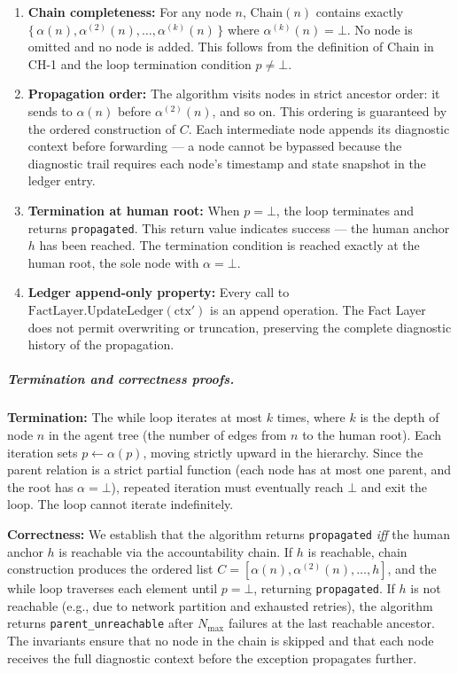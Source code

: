 \begin{enumerate}
\item[$\mathbf{I_1}$] \textbf{Chain completeness:} For any node $n$, $\text{Chain}(n)$ contains exactly $\{\,\alpha(n), \alpha^{(2)}(n), \dots, \alpha^{(k)}(n)\,\}$ where $\alpha^{(k)}(n) = \bot$. No node is omitted and no node is added. This follows from the definition of $\text{Chain}$ in CH-1 and the loop termination condition $p \neq \bot$.

\item[$\mathbf{I_2}$] \textbf{Propagation order:} The algorithm visits nodes in strict ancestor order: it sends to $\alpha(n)$ before $\alpha^{(2)}(n)$, and so on. This ordering is guaranteed by the ordered construction of $C$. Each intermediate node appends its diagnostic context before forwarding — a node cannot be bypassed because the diagnostic trail requires each node's timestamp and state snapshot in the ledger entry.

\item[$\mathbf{I_3}$] \textbf{Termination at human root:} When $p = \bot$, the loop terminates and returns \texttt{propagated}. This return value indicates success — the human anchor $h$ has been reached. The termination condition is reached exactly at the human root, the sole node with $\alpha = \bot$.

\item[$\mathbf{I_4}$] \textbf{Ledger append-only property:} Every call to $\text{FactLayer.UpdateLedger}(\text{ctx}')$ is an append operation. The Fact Layer does not permit overwriting or truncation, preserving the complete diagnostic history of the propagation.
\end{enumerate}

\subparagraph{Termination and correctness proofs.}

\textbf{Termination:} The while loop iterates at most $k$ times, where $k$ is the depth of node $n$ in the agent tree (the number of edges from $n$ to the human root). Each iteration sets $p \leftarrow \alpha(p)$, moving strictly upward in the hierarchy. Since the parent relation is a strict partial function (each node has at most one parent, and the root has $\alpha = \bot$), repeated iteration must eventually reach $\bot$ and exit the loop. The loop cannot iterate indefinitely.

\textbf{Correctness:} We establish that the algorithm returns \texttt{propagated} \emph{iff} the human anchor $h$ is reachable via the accountability chain. If $h$ is reachable, chain construction produces the ordered list $C = [\alpha(n), \alpha^{(2)}(n), \dots, h]$, and the while loop traverses each element until $p = \bot$, returning \texttt{propagated}. If $h$ is not reachable (e.g., due to network partition and exhausted retries), the algorithm returns \texttt{parent\_unreachable} after $N_{\max}$ failures at the last reachable ancestor. The invariants ensure that no node in the chain is skipped and that each node receives the full diagnostic context before the exception propagates further.

